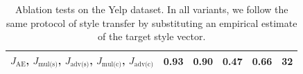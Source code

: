 \documentclass[letterpaper]{article} %
\newcommand{\loss}[1]{J_{\text{#1}}}
\begin{document}
\begin{table}[ht]
\begin{tabular}{| l || c | c | c | c | c |}
		$\loss{AE}$, $\loss{mul(s)}$, $\loss{adv(s)}$, $\loss{mul(c)}$, $\loss{adv(c)}$ & \textbf{0.93}   & 0.90              & \textbf{0.47}  & \textbf{0.66} & 32          \\ \hline
	\end{tabular}\vspace{-.2cm}
	\caption{Ablation tests on the Yelp dataset. In all variants, we follow the same protocol of style transfer by substituting an empirical estimate of the target style vector.}
	\label{tab:ablation-results}
\end{table}
\end{document}
